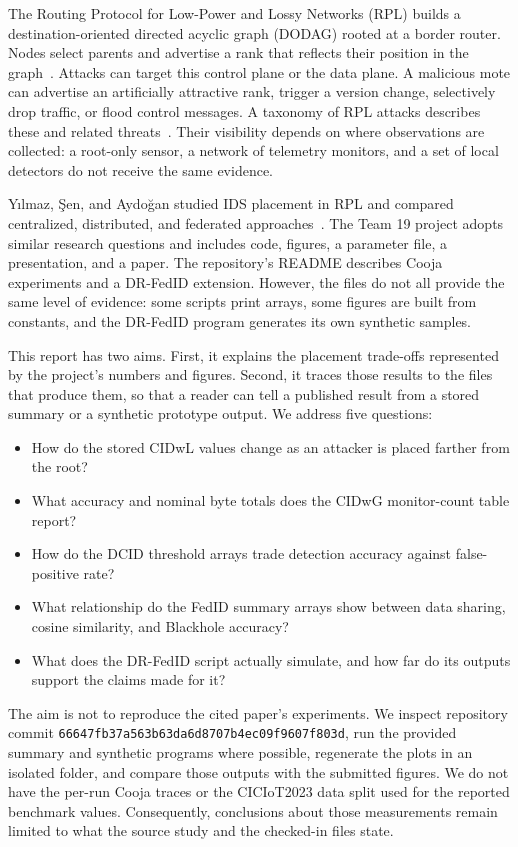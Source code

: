 \documentclass[conference]{IEEEtran}
\begin{document}
The Routing Protocol for Low-Power and Lossy Networks (RPL) builds a destination-oriented directed acyclic graph (DODAG) rooted at a border router. Nodes select parents and advertise a rank that reflects their position in the graph~\cite{winter2012rpl}. Attacks can target this control plane or the data plane. A malicious mote can advertise an artificially attractive rank, trigger a version change, selectively drop traffic, or flood control messages. A taxonomy of RPL attacks describes these and related threats~\cite{mayzaud2016taxonomy}. Their visibility depends on where observations are collected: a root-only sensor, a network of telemetry monitors, and a set of local detectors do not receive the same evidence.

Y{\i}lmaz, \c{S}en, and Aydo\u{g}an studied IDS placement in RPL and compared centralized, distributed, and federated approaches~\cite{yilmaz2025exploring}. The Team 19 project adopts similar research questions and includes code, figures, a parameter file, a presentation, and a paper. The repository's README describes Cooja experiments and a DR-FedID extension. However, the files do not all provide the same level of evidence: some scripts print arrays, some figures are built from constants, and the DR-FedID program generates its own synthetic samples.

This report has two aims. First, it explains the placement trade-offs represented by the project's numbers and figures. Second, it traces those results to the files that produce them, so that a reader can tell a published result from a stored summary or a synthetic prototype output. We address five questions:
\begin{itemize}
    \item How do the stored CIDwL values change as an attacker is placed farther from the root?
    \item What accuracy and nominal byte totals does the CIDwG monitor-count table report?
    \item How do the DCID threshold arrays trade detection accuracy against false-positive rate?
    \item What relationship do the FedID summary arrays show between data sharing, cosine similarity, and Blackhole accuracy?
    \item What does the DR-FedID script actually simulate, and how far do its outputs support the claims made for it?
\end{itemize}

The aim is not to reproduce the cited paper's experiments. We inspect repository commit \texttt{66647fb37a563b63da6d8707b4ec09f9607f803d}, run the provided summary and synthetic programs where possible, regenerate the plots in an isolated folder, and compare those outputs with the submitted figures. We do not have the per-run Cooja traces or the CICIoT2023 data split used for the reported benchmark values. Consequently, conclusions about those measurements remain limited to what the source study and the checked-in files state.
\end{document}
